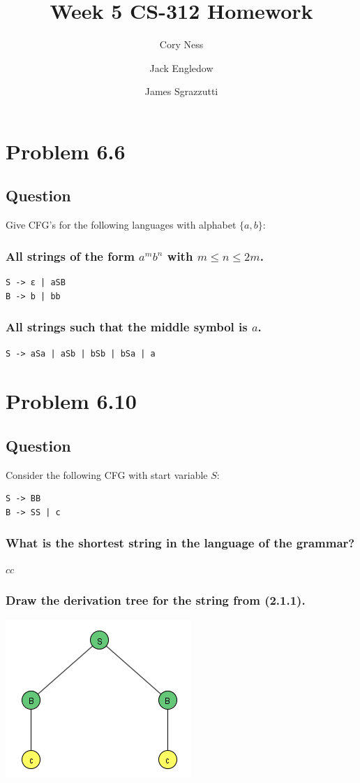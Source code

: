 \documentclass[12pt, a4paper]{article}
\title{Week 5 CS-312 Homework}
\author{
	Cory Ness
	\and
	Jack Engledow
	\and
	James Sgrazzutti
}
\begin{document}
\maketitle

\section{Problem 6.6}
\subsection{Question}
Give CFG's for the following languages with alphabet $\{a,b\}$:
\subsubsection{All strings of the form $a^{m}b^{n}$ with $m \leq n \leq 2m$.}
\begin{lstlisting}
S -> ε | aSB 
B -> b | bb
\end{lstlisting}
\subsubsection{All strings such that the middle symbol is $a$.}
\begin{lstlisting}
S -> aSa | aSb | bSb | bSa | a
\end{lstlisting}

\section{Problem 6.10}
\subsection{Question}
Consider the following CFG with start variable $S$:
\begin{lstlisting}
S -> BB
B -> SS | c
\end{lstlisting}
\subsubsection{What is the shortest string in the language of the grammar?}
\begin{center}
$cc$
\end{center}
\subsubsection{Draw the derivation tree for the string from (2.1.1).}
\begin{center}
\includegraphics[scale=1]{6.10.b}
\end{center}
\end{document}
